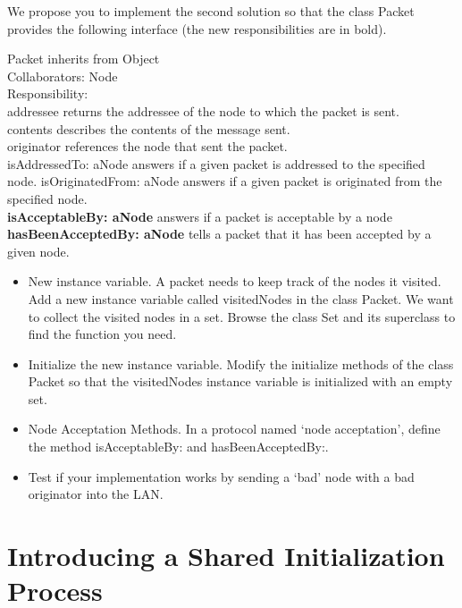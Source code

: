 We propose you to implement the second solution so that the class Packet 
provides the following interface (the new responsibilities are 
in bold).

\begin{code}
Packet inherits from Object\\
Collaborators: Node\\
Responsibility:\\
addressee returns the addressee of the node to which the packet 
is sent.\\
contents describes the contents of the message sent.\\
originator references the node that sent the packet.\\
isAddressedTo: aNode answers if a given packet is addressed to 
the specified node. isOriginatedFrom: aNode answers if a given 
packet is originated from the specified node. \\
\textbf{isAcceptableBy: aNode} answers if a packet is acceptable by 
a node\\
\textbf{hasBeenAcceptedBy: aNode} tells a packet that it has been 
accepted by a given node. \\
\end{code}

\begin{itemize}
\item
New instance variable. A packet needs to keep track of the nodes 
it visited. Add a new instance variable called visitedNodes in 
the class Packet. We want to collect the visited nodes in a set. Browse 
the class Set and its superclass to find the function you need.\\
\item
Initialize the new instance variable. Modify the initialize methods 
of the class Packet so that the visitedNodes instance variable 
is initialized with an empty set. \\
\item
Node Acceptation Methods. In a protocol named `node acceptation', 
define the method isAcceptableBy: and hasBeenAcceptedBy:. \\
\item
Test if your implementation works by sending a `bad' node with 
a bad originator into the LAN. 
\end{itemize}



\section{Introducing a Shared Initialization Process}


